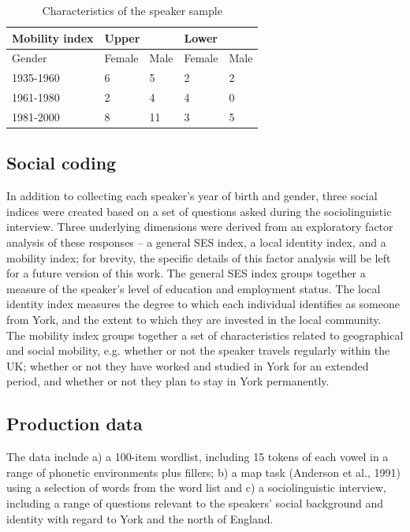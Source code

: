 \documentclass[PWPL]{article}
\begin{document}
\vspace*{6pt}
\begin{table}[htbp]
\centering
\begin{tabular}{l|l|l|l|l}
Mobility index&\multicolumn{2}{l|}{Upper}&\multicolumn{2}{l}{Lower}\\
\hline
Gender& Female& Male & Female & Male\\
\hline
1935-1960 & 6&5&2&2\\
 1961-1980& 2 &4&4&0\\
1981-2000&  8&11&3&5\\

\end{tabular}
\caption{Characteristics of the speaker sample}
\end{table}
\vspace*{6pt}

\subsection{Social coding}

In addition to collecting each speaker's year of birth and gender, three social indices were created based on a set of questions asked during the sociolinguistic interview. Three underlying dimensions were derived from an exploratory factor analysis of these responses -- a general SES index, a local identity index, and a mobility index; for brevity, the specific details of this factor analysis will be left for a future version of this work. The general SES index groups together a measure of the speaker's level of education and employment status. The local identity index measures the degree to which each individual identifies as someone from York, and the extent to which they are invested in the local community. The mobility index groups together a set of characteristics related to geographical and social mobility, e.g. whether or not the speaker travels regularly within the UK; whether or not they have worked and studied in York for an extended period, and whether or not they plan to stay in York permanently.

\subsection{Production data}

The data include a) a 100-item wordlist, including 15 tokens of each vowel in a range of phonetic environments plus fillers; b) a map task (Anderson et al., 1991) using a selection of words from the word list and c) a sociolinguistic interview, including a range of questions relevant to the speakers' social background and identity with regard to York and the north of England. 
\end{document}
